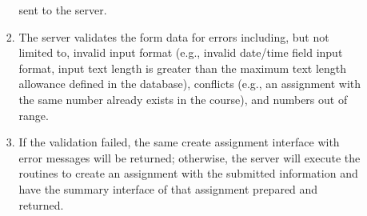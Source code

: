 \begin{enumerate}
\begin{itemize}
\begin{enumerate}
                sent to the server.
            \item The server validates the form data for errors including,
                but not limited to,
                invalid input format
                (e.g., invalid date/time field input format,
                input text length is greater than the maximum text length
                allowance defined in the database),
                conflicts (e.g., an assignment with the same
                number already exists in the course),
                and numbers out of range.
            \item If the validation failed, the same create assignment interface
                with error messages will be returned; otherwise, the server will
                execute the routines to create an assignment with the submitted
                information and have the summary interface of that assignment
                prepared and returned.
        \end{enumerate}
\end{itemize}


\end{enumerate}
